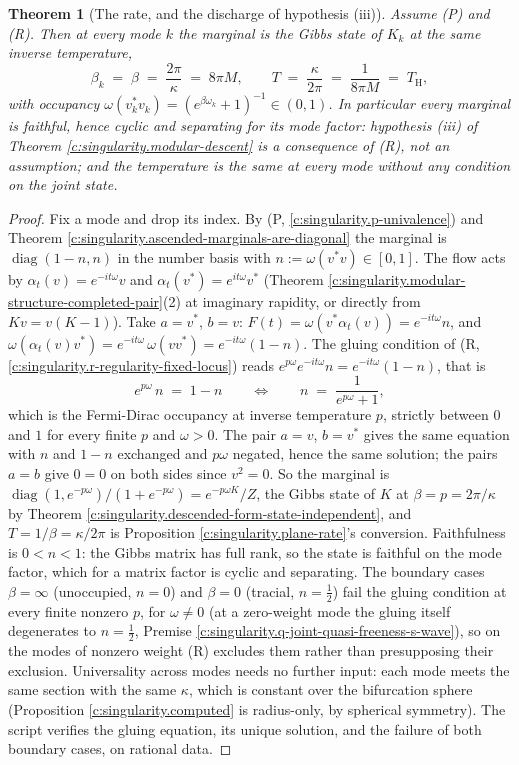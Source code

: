 \documentclass[11pt]{article}
\newtheorem{theorem}{Theorem}[section]
\theoremstyle{definition}
\theoremstyle{plain}
\providecommand{\TH}{}\renewcommand{\TH}{T_{\mathrm{H}}}
\begin{document}
\begin{theorem}[The rate, and the discharge of hypothesis (iii)]\label{c:singularity.rate-discharge-hypothesis-iii}
Assume (P) and (R). Then at every mode $k$ the marginal is the Gibbs state of $K_k$ at the same inverse temperature,
\[
\beta_k \;=\; \beta \;=\; \frac{2\pi}{\kappa} \;=\; 8\pi M , \qquad T \;=\; \frac{\kappa}{2\pi} \;=\; \frac{1}{8\pi M} \;=\; \TH ,
\]
with occupancy $\omega(v_k^{*}v_k) = (e^{\beta\omega_k} + 1)^{-1} \in (0,1)$. In particular every marginal is faithful, hence cyclic and separating for its mode factor: hypothesis (iii) of Theorem \ref{c:singularity.modular-descent} is a consequence of (R), not an assumption; and the temperature is the same at every mode without any condition on the joint state.
\end{theorem}
\begin{proof}
Fix a mode and drop its index. By (P, \ref{c:singularity.p-univalence}) and Theorem \ref{c:singularity.ascended-marginals-are-diagonal} the marginal is $\operatorname{diag}(1 - n, n)$ in the number basis with $n := \omega(v^{*}v) \in [0,1]$. The flow acts by $\alpha_t(v) = e^{-it\omega}v$ and $\alpha_t(v^{*}) = e^{it\omega}v^{*}$ (Theorem \ref{c:singularity.modular-structure-completed-pair}(2) at imaginary rapidity, or directly from $Kv = v(K - 1)$). Take $a = v^{*}$, $b = v$: $F(t) = \omega(v^{*}\alpha_t(v)) = e^{-it\omega}n$, and $\omega(\alpha_t(v)v^{*}) = e^{-it\omega}\,\omega(vv^{*}) = e^{-it\omega}(1 - n)$. The gluing condition of (R, \ref{c:singularity.r-regularity-fixed-locus}) reads $e^{p\omega}e^{-it\omega}n = e^{-it\omega}(1 - n)$, that is
\[
e^{p\omega}\,n \;=\; 1 - n \qquad\Longleftrightarrow\qquad n \;=\; \frac{1}{e^{p\omega} + 1} ,
\]
which is the Fermi-Dirac occupancy at inverse temperature $p$, strictly between $0$ and $1$ for every finite $p$ and $\omega > 0$. The pair $a = v$, $b = v^{*}$ gives the same equation with $n$ and $1 - n$ exchanged and $p\omega$ negated, hence the same solution; the pairs $a = b$ give $0 = 0$ on both sides since $v^{2} = 0$. So the marginal is $\operatorname{diag}(1, e^{-p\omega})/(1 + e^{-p\omega}) = e^{-p\omega K}/Z$, the Gibbs state of $K$ at $\beta = p = 2\pi/\kappa$ by Theorem \ref{c:singularity.descended-form-state-independent}, and $T = 1/\beta = \kappa/2\pi$ is Proposition \ref{c:singularity.plane-rate}'s conversion. Faithfulness is $0 < n < 1$: the Gibbs matrix has full rank, so the state is faithful on the mode factor, which for a matrix factor is cyclic and separating. The boundary cases $\beta = \infty$ (unoccupied, $n = 0$) and $\beta = 0$ (tracial, $n = \tfrac12$) fail the gluing condition at every finite nonzero $p$, for $\omega \neq 0$ (at a zero-weight mode the gluing itself degenerates to $n = \tfrac12$, Premise \ref{c:singularity.q-joint-quasi-freeness-s-wave}), so on the modes of nonzero weight (R) excludes them rather than presupposing their exclusion. Universality across modes needs no further input: each mode meets the same section with the same $\kappa$, which is constant over the bifurcation sphere (Proposition \ref{c:singularity.computed} is radius-only, by spherical symmetry). The script verifies the gluing equation, its unique solution, and the failure of both boundary cases, on rational data.


\end{proof}
\end{document}

